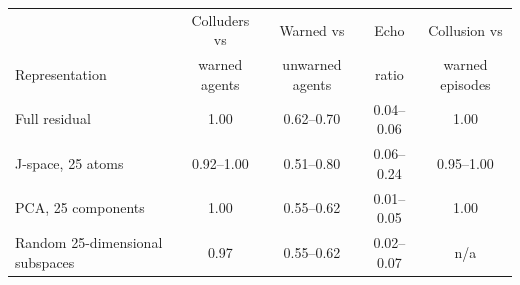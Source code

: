 \begin{tabularx}{\linewidth}{@{}Xcccc@{}}\toprule
 & Colluders vs & Warned vs & Echo & Collusion vs\\
Representation & warned agents & unwarned agents & ratio & warned episodes\\\midrule
Full residual & 1.00 & 0.62--0.70 & 0.04--0.06 & 1.00\\
J-space, 25 atoms & 0.92--1.00 & 0.51--0.80 & 0.06--0.24 & 0.95--1.00\\
PCA, 25 components & 1.00 & 0.55--0.62 & 0.01--0.05 & 1.00\\
Random 25-dimensional subspaces & 0.97 & 0.55--0.62 & 0.02--0.07 & n/a\\
\bottomrule\end{tabularx}
